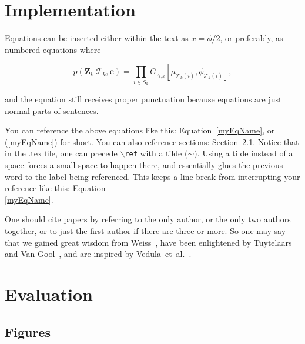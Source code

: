\documentclass{ucl_thesis}
\def\etal{{et~al.}}
\begin{document}
\chapter{Implementation}
\label{chp:impl}
%


Equations can be inserted either within the text as $x=\phi/2$, or preferably, as
numbered equations where

\begin{equation} \label{myEqName}
 p(\mathbf{Z}_{k}|\mathcal{T}_{k},\mathbf{e}) = \prod_{i\in S_{k}}
G_{z_{i,k}}[\mu_{\mathcal{T}_{k}(i)},\phi_{\mathcal{T}_{k}(i)}],
\end{equation}

and the equation still receives proper punctuation because equations are just normal parts of sentences.

You can reference the above equations like this:  Equation~\ref{myEqName}, or (\ref{myEqName}) for short.  You can also reference sections:  Section~\ref{sectionExample}. Notice that in the .tex file, one can precede \texttt{$\backslash$ref} with a tilde ($\sim$). Using a tilde instead of a space forces a small space to happen there, and essentially glues the previous word to the label being referenced. This keeps a line-break from interrupting your reference like this: Equation\\ \ref{myEqName}. 

One should cite papers by referring to the only author, or the only two authors together, or to just the first author if there are three or more.  So one may say that we gained great wisdom from Weiss~\cite{WeissICCV01}, have been enlightened by Tuytelaars and Van Gool~\cite{TuytelaarsCVPR.2004:SynchVideo}, and are inspired by Vedula~\etal~\cite{Vedula:2005:ISM}.







\chapter{Evaluation}
\label{chp:eval}
%


\section{Figures} \label{sectionExample}



\end{document}
